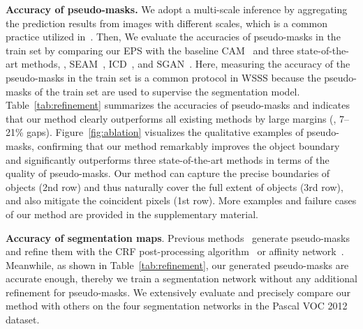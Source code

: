 \documentclass[final]{cvpr}
\begin{document}
\noindent \textbf{Accuracy of pseudo-masks.} We adopt a multi-scale inference by aggregating the prediction results from images with different scales, which is a common practice utilized in~\cite{ahn2018learning,wang2020self}. Then, We evaluate the accuracies of pseudo-masks in the train set by comparing our EPS with the baseline CAM~\cite{zhou2016learning} and three state-of-the-art methods, \ie, SEAM~\cite{wang2020self}, ICD~\cite{fan2020learning}, and SGAN~\cite{yao2020saliency}. Here, measuring the accuracy of the pseudo-masks in the train set is a common protocol in WSSS because the pseudo-masks of the train set are used to supervise the segmentation model. Table~\ref{tab:refinement} summarizes the accuracies of pseudo-masks and indicates that our method clearly outperforms all existing methods by large margins (\ie, 7--21\% gaps). Figure~\ref{fig:ablation} visualizes the qualitative examples of pseudo-masks, confirming that our method remarkably improves the object boundary and significantly outperforms three state-of-the-art methods in terms of the quality of pseudo-masks. Our method can capture the precise boundaries of objects (2nd row) and thus naturally cover the full extent of objects (3rd row), and also mitigate the coincident pixels (1st row). More examples and failure cases of our method are provided in the supplementary material.





\vspace{1mm}
\noindent \textbf{Accuracy of segmentation maps}. Previous methods~\cite{ahn2018learning, fan2020learning, wang2020self} generate pseudo-masks and refine them with the CRF post-processing algorithm~\cite{krahenbuhl2011efficient} or affinity network~\cite{ahn2018learning}. Meanwhile, as shown in Table~\ref{tab:refinement}, our generated pseudo-masks are accurate enough, thereby we train a segmentation network without any additional refinement for pseudo-masks. We extensively evaluate and precisely compare our method with others on the four segmentation networks in the Pascal VOC 2012 dataset.


\end{document}
